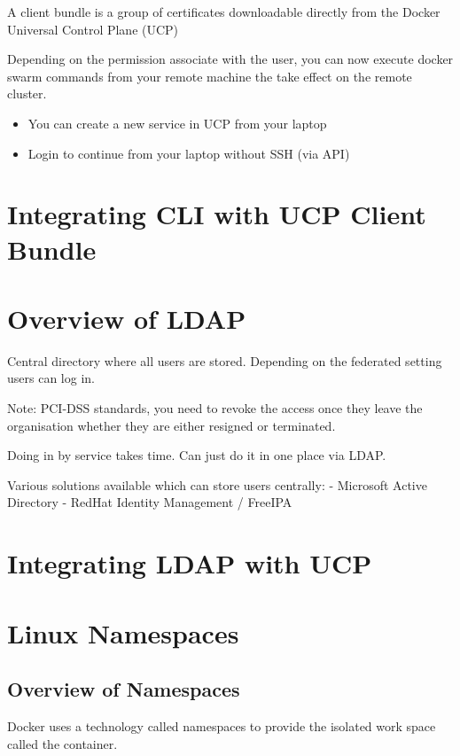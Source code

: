 \documentclass[11pt]{book}
\begin{document}
    A client bundle is a group of certificates downloadable directly from the Docker Universal Control Plane (UCP)

    Depending on the permission associate with the user, you can now execute docker swarm commands from your remote machine the take effect on the remote cluster.

    \begin{itemize}
        \item You can create a new service in UCP from your laptop
        \item Login to continue from your laptop without SSH (via API)
    \end{itemize}

    \section{Integrating CLI with UCP Client Bundle}

    \section{Overview of LDAP}
    Central directory where all users are stored.
    Depending on the federated setting users can log in.

    Note: PCI-DSS standards, you need to revoke the access once they leave the organisation whether they are either resigned or terminated.

    Doing in by service takes time. Can just do it in one place via LDAP.

    Various solutions available which can store users centrally:
    - Microsoft Active Directory
    - RedHat Identity Management / FreeIPA

    \section{Integrating LDAP with UCP}

    \section{Linux Namespaces}

    \subsection{Overview of Namespaces}
    Docker uses a technology called namespaces to provide the isolated work space called the container.
\end{document}
